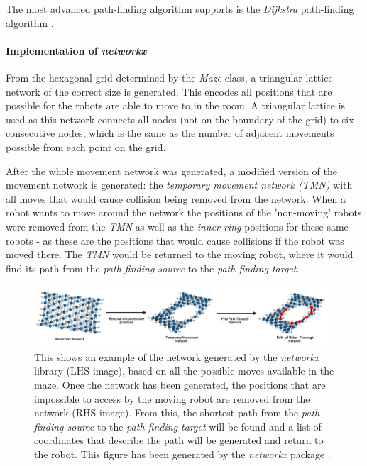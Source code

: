 The most advanced path-finding algorithm  supports is the \textit{Dijkstra} path-finding algorithm \cite{dijkstra1959pathfinding}. %

\paragraph{Implementation of \textit{networkx}}
From the hexagonal grid determined by the \textit{Maze} class, a triangular lattice network of the correct size is generated. This encodes all positions that are possible for the robots are able to move to in the room. A triangular lattice is used as this network connects all nodes (not on the boundary of the grid) to six consecutive nodes, which is the same as the number of adjacent movements possible from each point on the grid.

After the whole movement network was generated, a modified version of the movement network is generated: the \textit{temporary movement network (TMN)} with all moves that would cause collision being removed from the network. When a robot wants to move around the network the positions of the 'non-moving' robots were removed from the \textit{TMN} as well as the \textit{inner-ring} positions for these same robots - as these are the positions that would cause collisions if the robot was moved there.
The \textit{TMN} would be returned to the moving robot, where it would find its path from the \textit{path-finding source} to the \textit{path-finding target}.

\begin{figure}[h]
    \centering 
    \includegraphics[scale = 0.3]{images/pathfinding_algorithm.png}
    \caption{This shows an example of the network generated by the \textit{networkx} library (LHS image), based on all the possible moves available in the maze. Once the network has been generated, the positions that are impossible to access by the moving robot are removed from the network (RHS image). From this, the shortest path from the \textit{path-finding source} to the \textit{path-finding target} will be found and a list of coordinates that describe the path will be generated and return to the robot. This figure has been generated by the \textit{networkx} package \cite{networkx}.}
    \label{fig:networkx_diagrams}
\end{figure}


